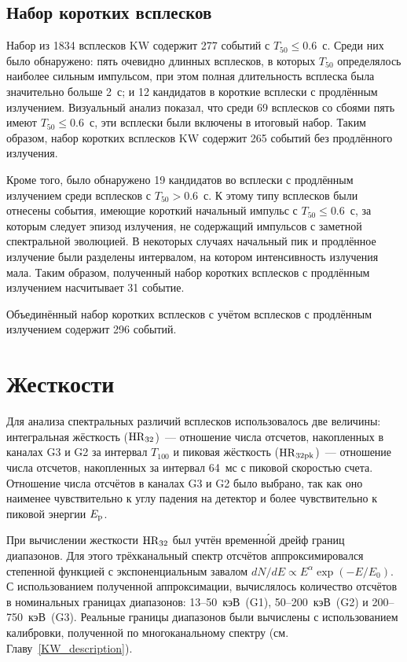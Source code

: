 \subsection{Набор коротких всплесков}
Набор из 1834 всплесков KW содержит 277 событий с $T_{50} \leq 0.6$~с.    %
Среди них было обнаружено: пять очевидно длинных всплесков, в которых $T_{50}$ 
определялось наиболее сильным импульсом, при этом полная длительность всплеска была 
значительно больше 2~с; и 12 кандидатов в короткие всплески с продлённым излучением.
Визуальный анализ показал, что среди 69 всплесков со сбоями пять имеют $T_{50} \leq 0.6$~с, 
эти всплески были включены в итоговый набор. 
Таким образом, набор коротких всплесков KW содержит 265 событий без продлённого излучения.

Кроме того, было обнаружено 19 кандидатов во всплески с продлённым излучением среди всплесков с $T_{50} > 0.6$~с. 
К этому типу всплесков были отнесены события, имеющие короткий начальный импульс с $T_{50} \leq 0.6$~с, 
за которым следует эпизод излучения, не содержащий импульсов с заметной спектральной эволюцией. 
В некоторых случаях начальный пик и продлённое излучение были разделены интервалом, 
на котором интенсивность излучения мала. Таким образом, полученный набор коротких всплесков с 
продлённым излучением насчитывает 31 событие.

Объединённый набор коротких всплесков с учётом всплесков с продлённым излучением 
содержит 296 событий.
\FloatBarrier

\section{Жесткости}\label{sec:Hardness}
Для анализа спектральных различий всплесков использовалось две величины: интегральная 
жёсткость (${\mathrm{HR}}_{32}$)~--- отношение числа отсчетов, накопленных в каналах G3 и G2 
за интервал $T_{100}$ и пиковая жёсткость (${\mathrm{HR}}_{32{\mathrm{pk}}}$)~--- отношение числа отсчетов, 
накопленных за интервал 64~мс с пиковой скоростью счета. 
Отношение числа отсчётов в каналах G3 и G2 было выбрано, так как 
оно наименее чувствительно к углу падения на детектор и более чувствительно 
к пиковой энергии $E_{\mathrm{p}}$.  

При вычислении жесткости ${\mathrm{HR}}_{32}$ был учтён временн\'{о}й дрейф границ диапазонов. 
Для этого трёхканальный спектр отсчётов аппроксимировался степенной функцией 
с экспоненциальным завалом $dN/dE \propto E^{\alpha} \exp(-E/E_0)$. 
С использованием полученной аппроксимации, вычислялось количество отсчётов в номинальных 
границах диапазонов: 13--50~кэВ~(G1), 50--200~кэВ~(G2) и 200--750~кэВ~(G3). 
Реальные границы диапазонов были вычислены с использованием калибровки, полученной 
по многоканальному спектру (см. Главу~\ref{KW_description}).

